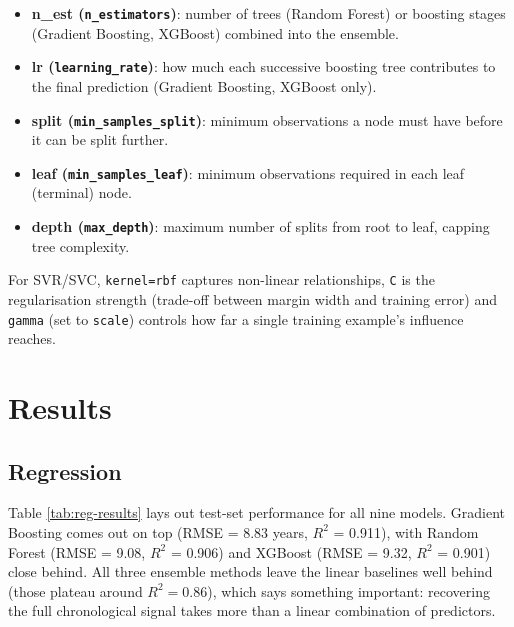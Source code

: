 \documentclass[11pt,a4paper]{article}
\providecommand{\tightlist}{\setlength{\itemsep}{0pt}\setlength{\parskip}{0pt}}
\let\oldsection\section
\renewcommand{\section}{\clearpage\oldsection}
\begin{document}
\begin{itemize}
\tightlist
\item
  \textbf{n\_est (\texttt{n\_estimators})}: number of trees (Random
  Forest) or boosting stages (Gradient Boosting, XGBoost) combined into
  the ensemble.
\item
  \textbf{lr (\texttt{learning\_rate})}: how much each successive
  boosting tree contributes to the final prediction (Gradient Boosting,
  XGBoost only).
\item
  \textbf{split (\texttt{min\_samples\_split})}: minimum observations a
  node must have before it can be split further.
\item
  \textbf{leaf (\texttt{min\_samples\_leaf})}: minimum observations
  required in each leaf (terminal) node.
\item
  \textbf{depth (\texttt{max\_depth})}: maximum number of splits from
  root to leaf, capping tree complexity.
\end{itemize}

For SVR/SVC, \texttt{kernel=rbf} captures non-linear relationships,
\texttt{C} is the regularisation strength (trade-off between margin
width and training error) and \texttt{gamma} (set to \texttt{scale})
controls how far a single training example's influence reaches.

\section{Results}\label{results}

\subsection{Regression}\label{regression}

Table \ref{tab:reg-results} lays out test-set performance for all nine
models. Gradient Boosting comes out on top (RMSE = 8.83 years, \(R^2\) =
0.911), with Random Forest (RMSE = 9.08, \(R^2\) = 0.906) and XGBoost
(RMSE = 9.32, \(R^2\) = 0.901) close behind. All three ensemble methods
leave the linear baselines well behind (those plateau around
\(R^2 = 0.86\)), which says something important: recovering the full
chronological signal takes more than a linear combination of predictors.
\end{document}
